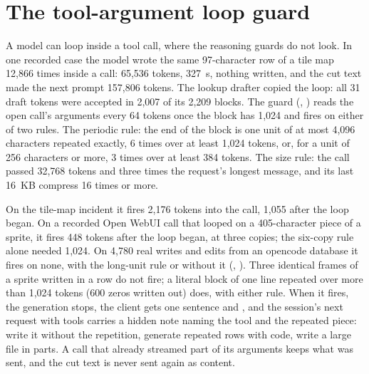 \section{The tool-argument loop guard}\label{sec:argloop}

A model can loop inside a tool call, where the reasoning guards do not look. In one recorded case the model wrote the same 97-character row of a tile map 12,866 times inside a  call: 65,536 tokens, 327~s, nothing written, and the cut text made the next prompt 157,806 tokens. The lookup drafter copied the loop: all 31 draft tokens were accepted in 2,007 of its 2,209 blocks. The guard (, ) reads the open call's arguments every 64 tokens once the block has 1,024 and fires on either of two rules. The periodic rule: the end of the block is one unit of at most 4,096 characters repeated exactly, 6 times over at least 1,024 tokens, or, for a unit of 256 characters or more, 3 times over at least 384 tokens. The size rule: the call passed 32,768 tokens and three times the request's longest message, and its last 16~KB compress 16 times or more.

On the tile-map incident it fires 2,176 tokens into the call, 1,055 after the loop began. On a recorded Open WebUI call that looped on a 405-character piece of a sprite, it fires 448 tokens after the loop began, at three copies; the six-copy rule alone needed 1,024. On 4,780 real writes and edits from an opencode database it fires on none, with the long-unit rule or without it (\measured, ). Three identical frames of a sprite written in a row do not fire; a literal block of one line repeated over more than 1,024 tokens (600 zeros written out) does, with either rule. When it fires, the generation stops, the client gets one sentence and , and the session's next request with tools carries a hidden note naming the tool and the repeated piece: write it without the repetition, generate repeated rows with code, write a large file in parts. A call that already streamed part of its arguments keeps what was sent, and the cut text is never sent again as content.


